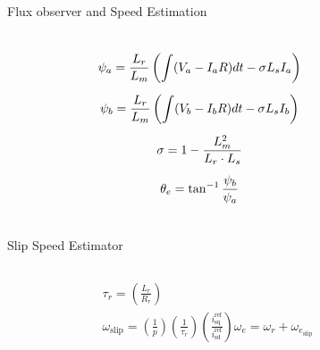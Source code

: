 \begin{frame}{Flux observer and Speed Estimation}
	\begin{columns}
		\begin{figure}
			\centering
		\end{figure}
		\begin{equation*}
			\begin{gathered}
				\psi_a = \frac{L_r}{L_m} \left( \int (V_a - I_a R) dt - \sigma L_s I_a \right) \\
				\addlinespace
				\psi_b = \frac{L_r}{L_m} \left( \int (V_b - I_b R) dt - \sigma L_s I_b \right) \\
				\addlinespace
				\sigma = 1 - \frac{L_m^2}{L_r \cdot L_s} \\
				\addlinespace
				\theta_e = \tan^{-1} \frac{\psi_b}{\psi_a}
			\end{gathered}
		\end{equation*}
	\end{columns}
\end{frame}



\begin{frame}{Slip Speed Estimator}
	\begin{columns}
		\column{0.4\textwidth}
		\begin{figure}
			\centering
		\end{figure}
		\column{0.6\textwidth}
		\begin{equation*}
			\begin{gathered}
				\tau_r = \left(\frac{L_r}{R_r}\right) \\[0.5em]
				\omega_\text{slip} = \left(\frac{1}{p}\right)\left(\frac{1}{\tau_r}\right)\left(\frac{i_\text{sq}^\text{ref}}{i_\text{sd}^\text{ref}}\right)
				\omega_e = \omega_r + \omega_{e_\text{slip}} \\[0.5em]
			\end{gathered}
		\end{equation*}
	\end{columns}
\end{frame}

